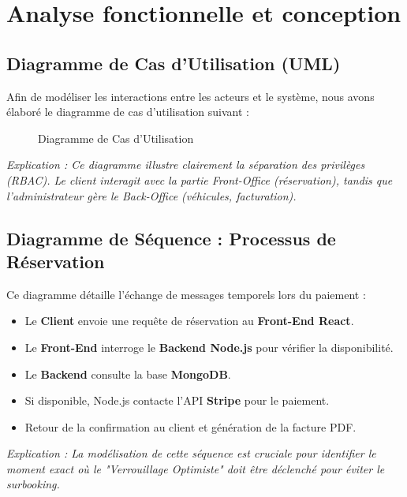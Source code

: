 \chapter{Analyse fonctionnelle et conception}

\section{Diagramme de Cas d'Utilisation (UML)}
Afin de modéliser les interactions entre les acteurs et le système, nous avons élaboré le diagramme de cas d'utilisation suivant :

\begin{figure}[H]
    \centering
    \caption{Diagramme de Cas d'Utilisation}
\end{figure}
\textit{Explication : Ce diagramme illustre clairement la séparation des privilèges (RBAC). Le client interagit avec la partie Front-Office (réservation), tandis que l'administrateur gère le Back-Office (véhicules, facturation).}

\section{Diagramme de Séquence : Processus de Réservation}
Ce diagramme détaille l'échange de messages temporels lors du paiement :
\begin{itemize}
    \item Le \textbf{Client} envoie une requête de réservation au \textbf{Front-End React}.
    \item Le \textbf{Front-End} interroge le \textbf{Backend Node.js} pour vérifier la disponibilité.
    \item Le \textbf{Backend} consulte la base \textbf{MongoDB}.
    \item Si disponible, Node.js contacte l'API \textbf{Stripe} pour le paiement.
    \item Retour de la confirmation au client et génération de la facture PDF.
\end{itemize}
\textit{Explication : La modélisation de cette séquence est cruciale pour identifier le moment exact où le "Verrouillage Optimiste" doit être déclenché pour éviter le surbooking.}

